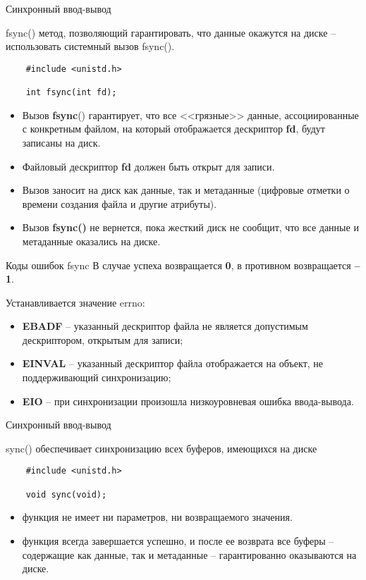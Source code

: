 \documentclass[xcolor=table]{beamer}
\begin{document}
\begin{frame}[fragile]{Синхронный ввод-вывод}
	\begin{block}{fsync()}
		метод, позволяющий гарантировать, что данные окажутся на диске -- использовать системный вызов fsync().
	\end{block}		
		
	\begin{verbatim}
	#include <unistd.h>
	
	int fsync(int fd);
	\end{verbatim}
	
	\begin{itemize}
		\item Вызов \textbf{fsync}() гарантирует, что все <<грязные>> данные, ассоциированные с конкретным файлом, на который отображается дескриптор \textbf{fd}, 	будут записаны на диск.
		\item Файловый дескриптор \textbf{fd} должен быть открыт для записи. 
		\item Вызов заносит на диск как данные, так и метаданные (цифровые отметки о времени создания файла и другие атрибуты).
		\item Вызов \textbf{fsync()} не вернется, пока жесткий диск не сообщит, что все данные и метаданные оказались на диске.
	\end{itemize}
\end{frame}

\begin{frame}{Коды ошибок fsync}
	В случае успеха возвращается \textbf{0}, в противном возвращается \textbf{–1}.
	
	\medskip	
	Устанавливается значение errno:
	\begin{itemize}
		\item \textbf{EBADF} -- указанный дескриптор файла не является допустимым дескриптором, открытым для записи;
		\item \textbf{EINVAL} -- указанный дескриптор файла отображается на объект, не поддерживающий синхронизацию;
		\item \textbf{EIO} -- при синхронизации произошла низкоуровневая ошибка ввода­-вывода.
	\end{itemize}
\end{frame}

\begin{frame}[fragile]{Синхронный ввод-вывод}
	\begin{block}{sync()}
		обеспечивает синхронизацию всех буферов, имеющихся на диске
	\end{block}
	
	\begin{verbatim}
	#include <unistd.h>

	void sync(void);
	\end{verbatim}
	
	\begin{itemize}
		\item функция не имеет ни параметров, ни возвращаемого значения. 
		\item функция всегда завершается успешно, и после ее возврата все буферы -- содержащие как данные, так и метаданные -- гарантированно оказываются на диске.
	\end{itemize}
\end{frame}
\end{document}
